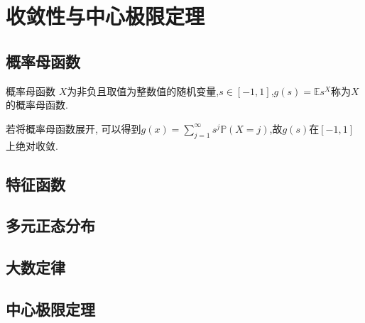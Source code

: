 \chapter{收敛性与中心极限定理}

\section{概率母函数}
\begin{definition}{概率母函数}{}
    $X$为非负且取值为整数值的随机变量,$s\in[-1,1]$,$g(s)=\mathbb{E}s^{X}$称为$X$的概率母函数.
\end{definition}
若将概率母函数展开, 可以得到$g(x)=\sum_{j=1}^{\infty}s^j\mathbb{P}(X=j)$,故$g(s)$在$[-1,1]$上绝对收敛.
\section{特征函数}

\section{多元正态分布}

\section{大数定律}

\section{中心极限定理}